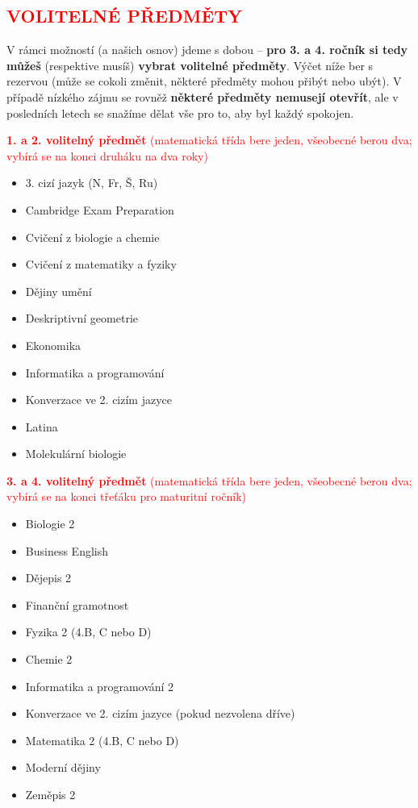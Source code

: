 \documentclass{article}
\newcommand{\podnadpis}[1]{
  \subsection*{\textcolor{red}{#1}}
}
\begin{document}
\newpage

\podnadpis{VOLITELNÉ PŘEDMĚTY}

\noindent V rámci možností (a našich osnov) jdeme s dobou -- \textbf{pro 3. a 4. ročník si tedy
můžeš} (respektive musíš) \textbf{vybrat volitelné předměty}. Výčet níže ber s rezervou
(může se cokoli změnit, některé předměty mohou přibýt nebo ubýt). V případě
nízkého zájmu se rovněž \textbf{některé předměty nemusejí otevřít}, ale v posledních
letech se snažíme dělat vše pro to, aby byl každý spokojen.

\begin{multicols}{2}
\noindent \textcolor{red}{\textbf{1. a 2. volitelný předmět} (matematická třída bere jeden, všeobecné berou dva; vybírá se na konci druháku na dva roky)}
  \begin{itemize}
    \item 3. cizí jazyk (N, Fr, Š, Ru)
    \item Cambridge Exam Preparation
    \item Cvičení z biologie a chemie
    \item Cvičení z matematiky a fyziky
    \item Dějiny umění
    \item Deskriptivní geometrie
    \item Ekonomika
    \item Informatika a programování
    \item Konverzace ve 2. cizím jazyce
    \item Latina
    \item Molekulární biologie
  \end{itemize}

  \noindent \textcolor{red}{\textbf{3. a 4. volitelný předmět} (matematická třída bere jeden, všeobecné berou dva; vybírá se na konci třeťáku pro maturitní ročník)}
  \begin{itemize}
    \item Biologie 2
    \item Business English
    \item Dějepis 2
    \item Finanční gramotnost
    \item Fyzika 2 (4.B, C nebo D)
    \item Chemie 2
    \item Informatika a programování 2
    \item Konverzace ve 2. cizím jazyce
    (pokud nezvolena dříve)
    \item Matematika 2 (4.B, C nebo D)
    \item Moderní dějiny
    \item Zeměpis 2
  \end{itemize}


\end{multicols}
\end{document}
